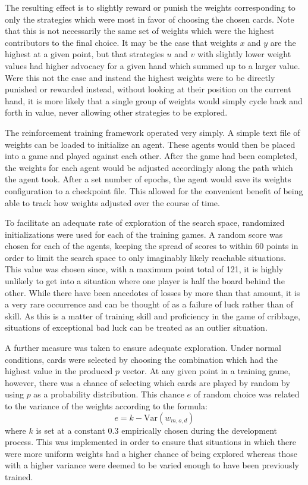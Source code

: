 The resulting effect is to slightly reward or punish the weights
corresponding to only the strategies which were most in favor of choosing
the chosen cards.
%
Note that this is not necessarily the same set of weights which were the highest
contributors to the final choice.
%
It may be the case that weights $x$ and $y$ are the highest at a given point,
but that strategies $u$ and $v$ with slightly lower weight values had higher
advocacy for a given hand which summed up to a larger value.
%
Were this not the case and instead the highest weights were to be directly
punished or rewarded instead,
without looking at their position on the current hand,
it is more likely that a single group of weights would simply cycle
back and forth in value,
never allowing other strategies to be explored.

The reinforcement training framework operated very simply.
%
A simple text file of weights can be loaded to initialize an agent.
%
These agents would then be placed into a game and played against each other.
%
After the game had been completed, the weights for each agent would be adjusted
accordingly along the path which the agent took.
%
After a set number of epochs, the agent would save its weights configuration to a
checkpoint file.
%
This allowed for the convenient benefit of being able to track how weights
adjusted over the course of time.

To facilitate an adequate rate of exploration of the search space,
randomized initializations were used for each of the training games.
%
A random score was chosen for each of the agents,
keeping the spread of scores to within 60 points
in order to limit the search space to only imaginably likely reachable
situations.
%
This value was chosen since,
with a maximum point total of 121,
it is highly unlikely to get into a situation where one player is half the board
behind the other.
%
While there have been anecdotes of losses by more than that amount,
it is a very rare occurrence and can be thought of as a failure of luck
rather than of skill.
%
As this is a matter of training skill and proficiency in the game of cribbage,
situations of exceptional bad luck can be treated as an outlier situation.

\newcommand{\Var}{\mathrm{Var}}
A further measure was taken to ensure adequate exploration.
%
Under normal conditions,
cards were selected by choosing the combination which had the highest value in
the produced $p$ vector.
%
At any given point in a training game, however,
there was a chance of selecting which cards are played
by random by using $p$ as a probability distribution.
%
This chance $e$ of random choice was related to the variance of the 
weights according to the formula:
\[
	e = k - \Var(w_{m,o,d})
\]
where $k$ is set at a constant $0.3$ empirically chosen during the
development process.
%
This was implemented in order to ensure that situations in which there were
more uniform weights had a higher chance of being explored
whereas those with a higher variance were deemed to be varied enough to
have been previously trained.

